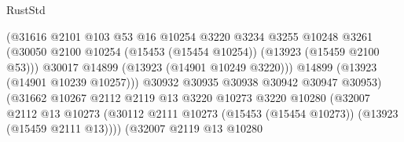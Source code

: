 \begin{lexlean}{RustStd}
\begin{coremodule}
                                            (@31616
                                              @2101
                                              @103
                                              @53
                                              @16
                                              @10254
                                              @3220
                                              @3234
                                              @3255
                                              @10248
                                              @3261
                                              (@30050
                                                @2100
                                                @10254
                                                (@15453 (@15454 @10254))
                                                (@13923 (@15459 @2100 @53)))
                                              @30017
                                              @14899
                                              (@13923 (@14901 @10249 @3220)))
                                            @14899
                                            (@13923 (@14901 @10239 @10257)))
                                          @30932
                                          @30935
                                          @30938
                                          @30942
                                          @30947
                                          @30953)
                                        (@31662
                                          @10267
                                          @2112
                                          @2119
                                          @13
                                          @3220
                                          @10273
                                          @3220
                                          @10280
                                          (@32007
                                            @2112
                                            @13
                                            @10273
                                            (@30112
                                              @2111
                                              @10273
                                              (@15453 (@15454 @10273))
                                              (@13923 (@15459 @2111 @13))))
                                          (@32007
                                            @2119
                                            @13
                                            @10280

\end{coremodule}
\end{lexlean}
